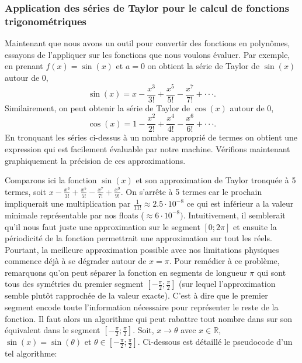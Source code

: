 \documentclass{article}
\begin{document}
\subsubsection{Application des séries de Taylor pour le calcul de fonctions trigonométriques}
Maintenant que nous avons un outil pour convertir des fonctions en polynômes, essayons de l'appliquer sur les fonctions que nous voulons évaluer.
Par exemple, en prenant $f(x) = \sin(x)$ et $a = 0$ on obtient la série de Taylor de $\sin(x)$ autour de 0, 
$$\sin(x) = x - \frac{x^3}{3!} + \frac{x^5}{5!} - \frac{x^7}{7!} + \cdot\cdot\cdot.$$
Similairement, on peut obtenir la série de Taylor de $\cos(x)$ autour de 0,
$$\cos(x) = 1 - \frac{x^2}{2!} + \frac{x^4}{4!} - \frac{x^6}{6!} + \cdot\cdot\cdot.$$
En tronquant les séries ci-dessus à un nombre approprié de termes on obtient une expression qui est facilement évaluable par notre machine.
Vérifions maintenant graphiquement la précision de ces approximations.
\begin{center}
\end{center}
Comparons ici la fonction $\sin(x)$ et son approximation de Taylor tronquée à 5 termes, soit $x-\frac{x^3}{3!}+\frac{x^5}{5!}-\frac{x^7}{7!}+\frac{x^9}{9!}$. On s'arrête à 5 termes car le prochain impliquerait une multiplication par $\frac{1}{11!} \approx 2.5 \cdot 10^{-8}$ ce qui est inférieur a la valeur minimale représentable par nos floats ($\approx 6 \cdot 10^{-8})$. Intuitivement, il semblerait qu'il nous faut juste une approximation sur le segment $[0; 2\pi]$ et ensuite la périodicité de la fonction permettrait une approximation sur tout les réels. Pourtant, la meilleure approximation possible avec nos limitations physiques commence déjà à se dégrader autour de $x = \pi$. Pour remédier à ce problème, remarquons qu'on peut séparer la fonction en segments de longueur $\pi$ qui sont tous des symétries du premier segment $[-\frac{\pi}{2}; \frac{\pi}{2}]$ (sur lequel l'approximation semble plutôt rapprochée de la valeur exacte). C'est à dire que le premier segment encode toute l'information nécessaire pour représenter le reste de la fonction. Il faut alors un algorithme qui peut rabattre tout nombre dans sur son équivalent dans le segment $[-\frac{\pi}{2}; \frac{\pi}{2}]$. Soit, $x\rightarrow \theta$ avec $x \in \mathbb{R}$, $\sin(x) = \sin(\theta)$ et $\theta \in [-\frac{\pi}{2}; \frac{\pi}{2}]$. Ci-dessous est détaillé le pseudocode d'un tel algorithme:
\end{document}
